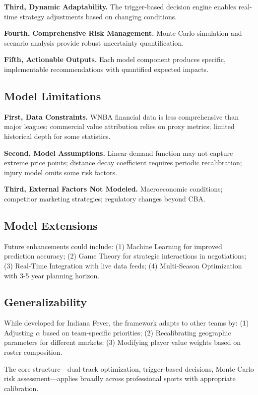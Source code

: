 \documentclass{mcmthesis}
\begin{document}
\textbf{Third, Dynamic Adaptability.} The trigger-based decision engine enables real-time strategy adjustments based on changing conditions.

\textbf{Fourth, Comprehensive Risk Management.} Monte Carlo simulation and scenario analysis provide robust uncertainty quantification.

\textbf{Fifth, Actionable Outputs.} Each model component produces specific, implementable recommendations with quantified expected impacts.

\subsection{Model Limitations}

\textbf{First, Data Constraints.} WNBA financial data is less comprehensive than major leagues; commercial value attribution relies on proxy metrics; limited historical depth for some statistics.

\textbf{Second, Model Assumptions.} Linear demand function may not capture extreme price points; distance decay coefficient requires periodic recalibration; injury model omits some risk factors.

\textbf{Third, External Factors Not Modeled.} Macroeconomic conditions; competitor marketing strategies; regulatory changes beyond CBA.

\subsection{Model Extensions}

Future enhancements could include: (1) Machine Learning for improved prediction accuracy; (2) Game Theory for strategic interactions in negotiations; (3) Real-Time Integration with live data feeds; (4) Multi-Season Optimization with 3-5 year planning horizon.

\subsection{Generalizability}

While developed for Indiana Fever, the framework adapts to other teams by: (1) Adjusting $\alpha$ based on team-specific priorities; (2) Recalibrating geographic parameters for different markets; (3) Modifying player value weights based on roster composition.

The core structure---dual-track optimization, trigger-based decisions, Monte Carlo risk assessment---applies broadly across professional sports with appropriate calibration.
\end{document}
